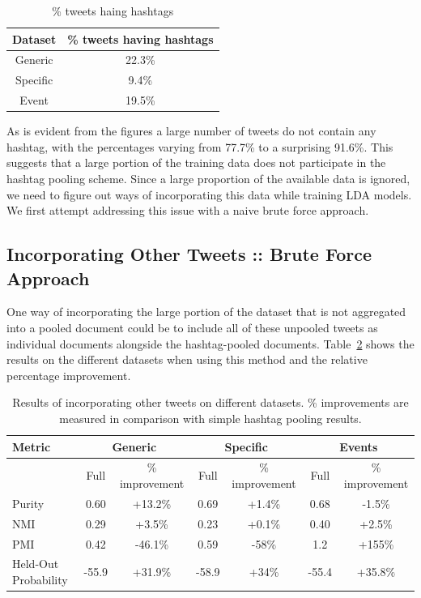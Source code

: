 \documentclass{sig-alternate}
\begin{document}
\begin{table}[!h]
\centering
	\begin{tabular}{|c|c|}
	\hline
	Dataset & \% tweets having hashtags\\
	\hline
	Generic & 22.3\%\\
	\hline
	Specific & 9.4\% \\
	\hline
	Event & 19.5\% \\
	\hline
	\end{tabular}
\caption{ \% tweets haing hashtags}\label{tbl-7}
\end{table}

As is evident from the figures a large number of tweets do not contain
any hashtag, with the percentages varying from 77.7\% to a surprising
91.6\%. This suggests that a large portion of the training data does
not participate in the hashtag pooling scheme. Since a large proportion
of the available data is ignored, we need to figure out ways of
incorporating this data while training LDA models.  We first attempt addressing this issue with a naive brute force approach.

\subsection*{Incorporating Other Tweets :: Brute Force Approach}

One way of incorporating the large portion of the dataset that is not
aggregated into a pooled document could be to include all of these
unpooled tweets as individual documents alongside the hashtag-pooled
documents.  Table~\ref{tbl-8} shows the results on the different datasets when using this method and the relative percentage improvement.

\begin{table}[!ht]
\centering
{
	\begin{tabular}{|l|cc|cc|cc|}
	\hline
	Metric  & \multicolumn {2}{c|}{Generic} & \multicolumn {2}{c|}{Specific} & \multicolumn {2}{c|}{Events}\\
	\hline
	 & Full & \% improvement & Full & \% improvement & Full & \% improvement\\
	\hline
	Purity & 0.60 & +13.2\% & 0.69 & +1.4\% & 0.68 & -1.5\% \\
	\hline
	NMI & 0.29 & +3.5\% & 0.23 & +0.1\% & 0.40 & +2.5\% \\
	\hline
	PMI & 0.42 & -46.1\% & 0.59 & -58\% & 1.2 & +155\% \\
	\hline
	Held-Out Probability & -55.9 & +31.9\% & -58.9 & +34\% & -55.4 & +35.8\%\\
	\hline
	\end{tabular}
}
\caption{Results of incorporating other tweets on different datasets. \% improvements are measured in comparison with simple hashtag pooling results.}\label{tbl-8}
\end{table}
\end{document}
